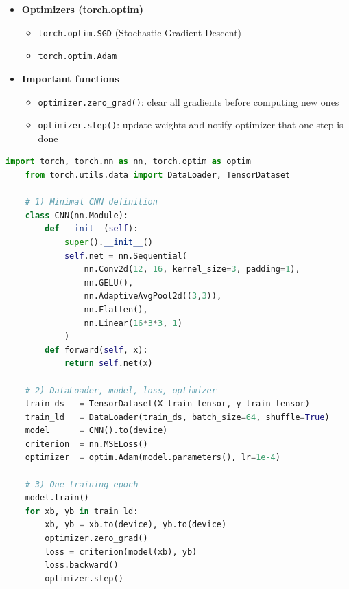 \documentclass[8pt,twocolumn]{article}
\begin{document}
\begin{itemize}
    \setlength{\itemsep}{0pt}
    \setlength{\parskip}{0pt}
    \item \textbf{Optimizers (torch.optim)}\vspace{-0.6em}
      \begin{itemize}
        \setlength{\itemsep}{0pt}
        \setlength{\parskip}{0pt}
        \item \texttt{torch.optim.SGD} (Stochastic Gradient Descent)
        \item \texttt{torch.optim.Adam}
      \end{itemize}
    \item \textbf{Important functions}\vspace{-0.6em}
      \begin{itemize}
        \setlength{\itemsep}{0pt}
        \setlength{\parskip}{0pt}
        \item \texttt{optimizer.zero\_grad()}: clear all gradients before computing new ones
        \item \texttt{optimizer.step()}: update weights and notify optimizer that one step is done
      \end{itemize}
  \end{itemize}
  \vspace{-0.6em}
  \begin{lstlisting}[language=Python]
    import torch, torch.nn as nn, torch.optim as optim
    from torch.utils.data import DataLoader, TensorDataset
    
    # 1) Minimal CNN definition
    class CNN(nn.Module):
        def __init__(self):
            super().__init__()
            self.net = nn.Sequential(
                nn.Conv2d(12, 16, kernel_size=3, padding=1),
                nn.GELU(),
                nn.AdaptiveAvgPool2d((3,3)),
                nn.Flatten(),
                nn.Linear(16*3*3, 1)
            )
        def forward(self, x):
            return self.net(x)
    
    # 2) DataLoader, model, loss, optimizer
    train_ds   = TensorDataset(X_train_tensor, y_train_tensor)
    train_ld   = DataLoader(train_ds, batch_size=64, shuffle=True)
    model      = CNN().to(device)
    criterion  = nn.MSELoss()
    optimizer  = optim.Adam(model.parameters(), lr=1e-4)
    
    # 3) One training epoch
    model.train()
    for xb, yb in train_ld:
        xb, yb = xb.to(device), yb.to(device)
        optimizer.zero_grad()
        loss = criterion(model(xb), yb)
        loss.backward()
        optimizer.step()
    \end{lstlisting}
    
\end{document}
